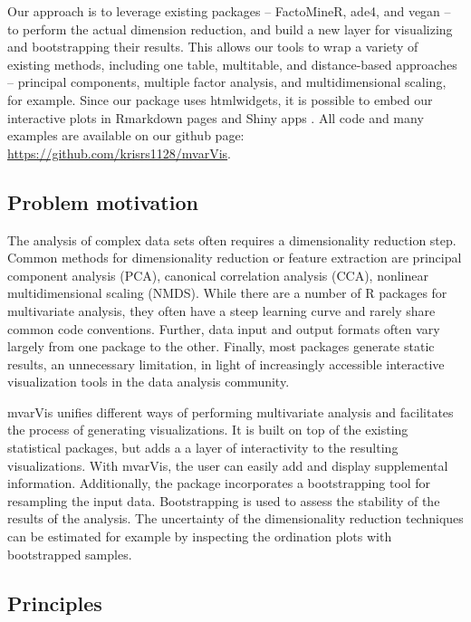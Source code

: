 Our approach is to leverage existing packages -- FactoMineR, ade4, and vegan
\citep{le2008factominer, dray2007ade4, oksanen2007vegan} -- to perform the
actual dimension reduction, and build a new layer for visualizing and
bootstrapping their results. This allows our tools to wrap a variety of existing
methods, including one table, multitable, and distance-based approaches --
principal components, multiple factor analysis, and multidimensional scaling,
for example. Since our package uses htmlwidgets, it is possible to embed our
interactive plots in Rmarkdown pages and Shiny apps
\citep{vaidyanathan2014htmlwidgets}. All code and many examples are available on
our github page: \url{https://github.com/krisrs1128/mvarVis}.

\subsection{Problem motivation}

The analysis of complex data sets often requires a dimensionality reduction
step. Common methods for dimensionality reduction or feature extraction are
principal component analysis (PCA), canonical correlation analysis (CCA),
nonlinear multidimensional scaling (NMDS). While there are a number of R
packages for multivariate analysis, they often have a steep learning curve and
rarely share common code conventions. Further, data input and output formats
often vary largely from one package to the other. Finally, most packages
generate static results, an unnecessary limitation, in light of increasingly
accessible interactive visualization tools in the data analysis community.

mvarVis unifies different ways of performing multivariate analysis and
facilitates the process of generating visualizations. It is built on top of the
existing statistical packages, but adds a a layer of interactivity to the
resulting visualizations. With mvarVis, the user can easily add and display
supplemental information. Additionally, the package incorporates a bootstrapping
tool for resampling the input data. Bootstrapping is used to assess the
stability of the results of the analysis. The uncertainty of the dimensionality
reduction techniques can be estimated for example by inspecting the ordination
plots with bootstrapped samples.

\subsection{Principles}

